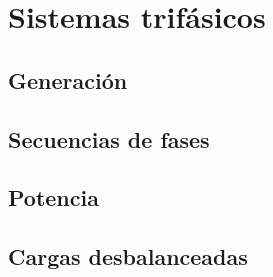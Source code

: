 \chapter{Sistemas trifásicos}

\section{Generación}

\section{Secuencias de fases}

\section{Potencia}

\section{Cargas desbalanceadas}